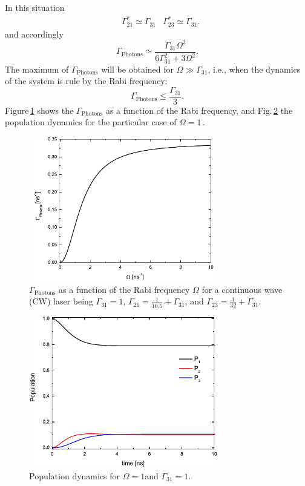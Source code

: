 In this situation
\begin{align}
\label{Mod_relax_large}
& \Gamma_{21}^*\simeq\Gamma_{31}
& \Gamma_{23}^*\simeq\Gamma_{31}.
\end{align}
and accordingly
\begin{equation}
\Gamma_{\text{Photons}}\simeq\frac{\Gamma_{31}\Omega^2}{6\Gamma^2_{31}+3\Omega^2}.
\end{equation}
The maximum of $\Gamma_{\text{Photons}}$ will be obtained for $\Omega\gg\Gamma_{31}$, i.e., when the dynamics of the system is rule by the Rabi frequency:
\begin{equation}
\Gamma_{\text{Photons}}\leq\frac{\Gamma_{31}}{3}.
\end{equation}
Figure\,\ref{2DHighD} shows the $\Gamma_{\text{Photons}}$ as a function of the Rabi frequency, and Fig.\,\ref{popuHighD} the population dynamics for the particular case of $\Omega=1$\,\ns.

\begin{figure}[ht!]
\begin{center}
\includegraphics[width=8.3cm, height=6.3cm]{imgs/2DHighD.pdf}
\caption{\label{2DHighD} $\Gamma_{\text{Photons}}$ as a function of the Rabi frequency $\Omega$ for a continuous wave (CW) laser being $\Gamma_{31}=1$\ns, $\Gamma_{21}=\frac{1}{10.5}+\Gamma_{31}$\ns, and $\Gamma_{23}=\frac{1}{32}+\Gamma_{31}$\ns. }
\end{center}
\end{figure}

\begin{figure}[ht!]
\begin{center}
\includegraphics[width=8.3cm, height=6.6cm]{imgs/popuHighD.pdf}
\caption{\label{popuHighD} Population dynamics for $\Omega=1$\ns and  $\Gamma_{31}=1$\ns.}
\end{center}
\end{figure}

